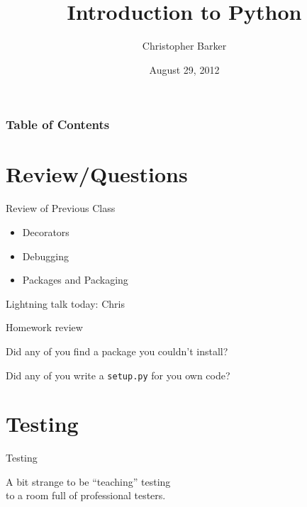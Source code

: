 \documentclass{beamer}
\title[Intro to Python: Week 9]{Introduction  to Python}
\author{Christopher Barker}
\institute{UW Continuing Education / Isilon}
\date{August 29, 2012}
\begin{document}
\begin{frame}
  \titlepage
\end{frame}

\begin{frame}
\frametitle{Table of Contents}
  \tableofcontents
\end{frame}


\section{Review/Questions}

\begin{frame}[fragile]{Review of Previous Class}


\vfill
\begin{itemize}
  \item Decorators
  \item Debugging
  \item Packages and Packaging
\end{itemize}

\vfill
{\Large Lightning talk today: Chris}

\end{frame}


\begin{frame}[fragile]{Homework review}


\vfill
{\Large Did any of you find a package you couldn't install?}


\vfill
{\Large Did any of you write a \verb|setup.py| for you own code?}

\vfill

\end{frame}

\section{Testing}

\begin{frame}[fragile]{Testing}

\vfill
{\LARGE A bit strange to be ``teaching'' testing \\[0.1in]
to a room full of professional testers.}

\vfill

\end{frame} 
\end{document}
